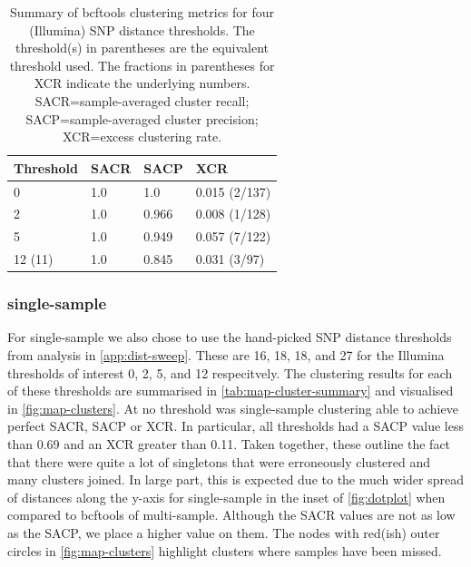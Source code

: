 \begin{table}
\centering
\begin{tabular}{llll}
Threshold & SACR & SACP  & XCR           \\
\hline
0         & 1.0  & 1.0   & 0.015 (2/137) \\
\hline
2         & 1.0  & 0.966 & 0.008 (1/128) \\
\hline
5         & 1.0  & 0.949 & 0.057 (7/122) \\
\hline
12 (11)       & 1.0  & 0.845 & 0.031 (3/97) 
\end{tabular}
\caption{Summary of bcftools clustering metrics for four (Illumina) SNP distance thresholds. The threshold(s) in parentheses are the \ont{} equivalent threshold used. The fractions in parentheses for XCR indicate the underlying numbers. SACR=sample-averaged cluster recall; SACP=sample-averaged cluster precision; XCR=excess clustering rate.}
\label{tab:bcftools-cluster-summary}
\end{table}

\subsubsection{\pandora{} single-sample}

For \pandora{} single-sample we also chose to use the hand-picked SNP distance thresholds from analysis in \autoref{app:dist-sweep}. These are 16, 18, 18, and 27 for the Illumina thresholds of interest 0, 2, 5, and 12 respecitvely. The clustering results for each of these thresholds are summarised in \autoref{tab:map-cluster-summary} and visualised in \autoref{fig:map-clusters}. At no threshold was \pandora{} single-sample clustering able to achieve perfect SACR, SACP or XCR. In particular, all thresholds had a SACP value less than 0.69 and an XCR greater than 0.11. Taken together, these outline the fact that there were quite a lot of singletons that were erroneously clustered and many clusters joined. In large part, this is expected due to the much wider spread of distances along the y-axis for \pandora{} single-sample in the inset of \autoref{fig:dotplot} when compared to bcftools of \pandora{} multi-sample. Although the SACR values are not as low as the SACP, we place a higher value on them. The nodes with red(ish) outer circles in \autoref{fig:map-clusters} highlight clusters where samples have been missed.


